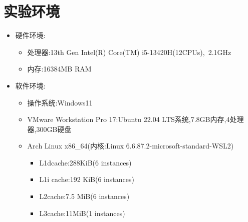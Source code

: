 \section{实验环境}
\begin{itemize}
 \item 硬件环境:
\begin{itemize}
    \item 处理器:13th Gen Intel(R) Core(TM) i5-13420H(12CPUs),~2.1GHz
    \item 内存:16384MB RAM
 \end{itemize}
 
 \item 软件环境:
 \begin{itemize}
    \item 操作系统:Windows11
    \item VMware Workstation Pro 17:Ubuntu 22.04 LTS系统,7.8GB内存,4处理器,300GB硬盘
    \item Arch Linux x86\_64(内核:Linux 6.6.87.2-microsoft-standard-WSL2)
    \begin{itemize}
      \item L1d\quad cache:288KiB(6 instances)
      \item L1i \quad cache:192 KiB(6 instances)
      \item L2\quad cache:7.5 MiB(6 instances)
      \item L3\quad cache:11MiB(1 instances)
    \end{itemize}
 \end{itemize}
\end{itemize}